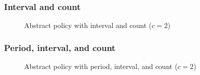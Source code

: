 \subsubsection{Interval and count}


\begin{figure}[H]
  \centering
  
  \caption{Abstract policy with interval and count ($c = 2$)}
\end{figure}


\subsubsection{Period, interval, and count}


\begin{figure}[H]
  \centering
  
  \caption{Abstract policy with period, interval, and count ($c = 2$)}
\end{figure}
